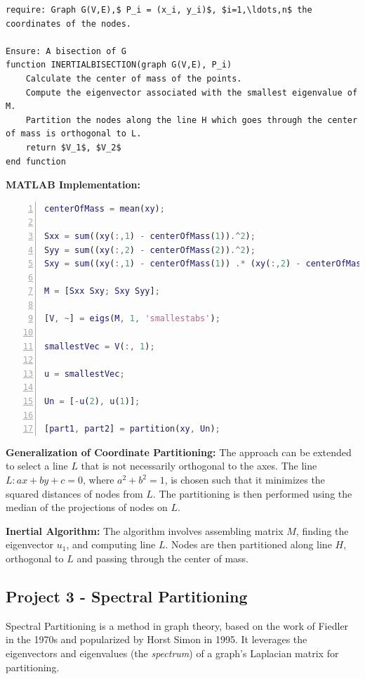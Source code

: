 \documentclass[unicode,11pt,a4paper,oneside,numbers=endperiod,openany]{scrartcl}
\begin{document}
\lstset{mathescape=true} %

\begin{lstlisting}
require: Graph G(V,E),$ P_i = (x_i, y_i)$, $i=1,\ldots,n$ the coordinates of the nodes.

Ensure: A bisection of G
function INERTIALBISECTION(graph G(V,E), P_i)
    Calculate the center of mass of the points.
    Compute the eigenvector associated with the smallest eigenvalue of M.
    Partition the nodes along the line H which goes through the center of mass is orthogonal to L.
    return $V_1$, $V_2$
end function
\end{lstlisting}



\textbf{MATLAB Implementation:}
\begin{lstlisting}[language=Matlab, numbers=left]
centerOfMass = mean(xy);

Sxx = sum((xy(:,1) - centerOfMass(1)).^2);
Syy = sum((xy(:,2) - centerOfMass(2)).^2);
Sxy = sum((xy(:,1) - centerOfMass(1)) .* (xy(:,2) - centerOfMass(2)));

M = [Sxx Sxy; Sxy Syy];

[V, ~] = eigs(M, 1, 'smallestabs');

smallestVec = V(:, 1);

u = smallestVec;

Un = [-u(2), u(1)];

[part1, part2] = partition(xy, Un);
\end{lstlisting}

\textbf{Generalization of Coordinate Partitioning:}
The approach can be extended to select a line \( L \) that is not necessarily orthogonal to the axes. The line \( L: ax + by + c = 0 \), where \( a^2 + b^2 = 1 \), is chosen such that it minimizes the squared distances of nodes from \( L \). The partitioning is then performed using the median of the projections of nodes on \( L \).

\textbf{Inertial Algorithm:}
The algorithm involves assembling matrix \( M \), finding the eigenvector \( u_1 \), and computing line \( L \). Nodes are then partitioned along line \( H \), orthogonal to \( L \) and passing through the center of mass.

\subsection{Project 3 - Spectral Partitioning}

Spectral Partitioning is a method in graph theory, based on the work of Fiedler in the 1970s and popularized by Horst Simon in 1995. It leverages the eigenvectors and eigenvalues (the \textit{spectrum}) of a graph's Laplacian matrix for partitioning.
\end{document}
